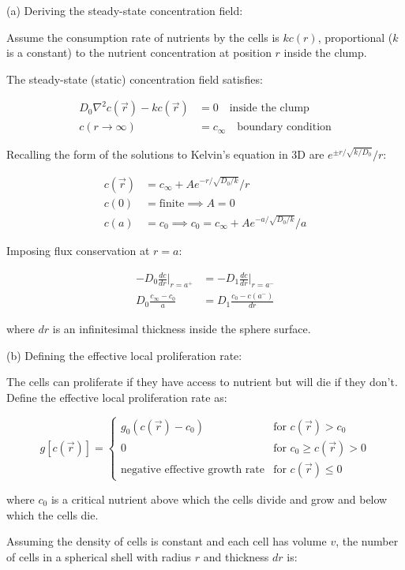\documentclass{article}
\begin{document}
(a) Deriving the steady-state concentration field:

Assume the consumption rate of nutrients by the cells is $kc(r)$, proportional ($k$ is a constant) to the nutrient concentration at position $r$ inside the clump.

The steady-state (static) concentration field satisfies:

\begin{align*}
D_0\nabla^2c(\vec{r}) - kc(\vec{r}) &= 0 \quad \text{inside the clump} \\
c(r \to \infty) &= c_\infty \quad \text{boundary condition}
\end{align*}

Recalling the form of the solutions to Kelvin's equation in 3D are $e^{\pm r/\sqrt{k/D_0}}/r$:

\begin{align*}
c(\vec{r}) &= c_\infty + Ae^{-r/\sqrt{D_0/k}}/r \\
c(0) &= \text{finite} \implies A = 0 \\
c(a) &= c_0 \implies c_0 = c_\infty + Ae^{-a/\sqrt{D_0/k}}/a
\end{align*}

Imposing flux conservation at $r=a$:

\begin{align*}
-D_0\frac{dc}{dr}\bigg|_{r=a^+} &= -D_1\frac{dc}{dr}\bigg|_{r=a^-} \\
D_0\frac{c_\infty - c_0}{a} &= D_1\frac{c_0 - c(a^-)}{dr}
\end{align*}

where $dr$ is an infinitesimal thickness inside the sphere surface.

(b) Defining the effective local proliferation rate:

The cells can proliferate if they have access to nutrient but will die if they don't. Define the effective local proliferation rate as:

\[
g[c(\vec{r})] = 
\begin{cases}
    g_0(c(\vec{r}) - c_0) & \text{for } c(\vec{r}) > c_0 \\
    0 & \text{for } c_0 \geq c(\vec{r}) > 0 \\
    \text{negative effective growth rate} & \text{for } c(\vec{r}) \leq 0
\end{cases}
\]

where $c_0$ is a critical nutrient above which the cells divide and grow and below which the cells die.

Assuming the density of cells is constant and each cell has volume $v$, the number of cells in a spherical shell with radius $r$ and thickness $dr$ is:
\end{document}
